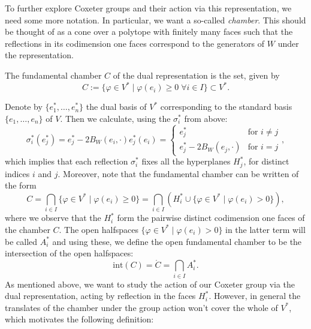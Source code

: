 
To further explore Coxeter groups and their action via this representation, we need some more notation.
In particular, we want a so-called \emph{chamber}.
This should be thought of as a cone over a polytope with finitely many faces such that the reflections in its codimension one faces correspond to the generators of \(W\) under the representation.

\begin{definition}\label{def:chamber}
    The fundamental chamber \(C\) of the dual representation is the set, given by
    \[C := \{\varphi \in V^* \;\vert\; \varphi (e_i) \geq 0 \;\forall i\in I\} \subset V^*.\]
\end{definition}

Denote by \(\{e_1^*,\ldots, e_n^*\}\) the dual basis of \(V^*\) corresponding to the standard basis \(\{e_1,\ldots, e_n\}\) of \(V\).
Then we calculate, using the \(\sigma_i^*\) from above:
\begin{equation*}
    \sigma_i^*(e_j^*) = e_j^* - 2B_W(e_i,\cdot)e_j^*(e_i) =
    \begin{cases}
        e_j^*                   & \text{for } i\neq j \\
        e_j^* - 2B_W(e_j,\cdot) & \text{for } i=j
    \end{cases},
\end{equation*}
which implies that each reflection \(\sigma_i^*\) fixes all the hyperplanes \(H_j^*\), for distinct indices \(i\) and \(j\).
Moreover, note that the fundamental chamber can be written of the form %
\[C = \bigcap_{i\in I}\{\varphi\in V^*\;\vert\; \varphi(e_i)\geq 0\} = \bigcap_{i\in I} (H_i^* \cup \{\varphi\in V^*\;\vert\; \varphi(e_i)> 0\}),\] %
where we observe that the \(H_i^*\) form the pairwise distinct codimension one faces of the chamber \(C\).
The open halfspaces \(\{\varphi \in V^* \;\vert\; \varphi(e_i) > 0\}\) in the latter term will be called \(A_i^*\) and using these, we define the open fundamental chamber to be the intersection of the open halfspaces:
\[\text{int}(C) = \mathring{C} = \bigcap_{i \in I} A_i^*.\] %
As mentioned above, we want to study the action of our Coxeter group via the dual representation, acting by reflection in the faces \(H_i^*\).
However, in general the translates of the chamber under the group action won't cover the whole of \(V^*\), which motivates the following definition:


